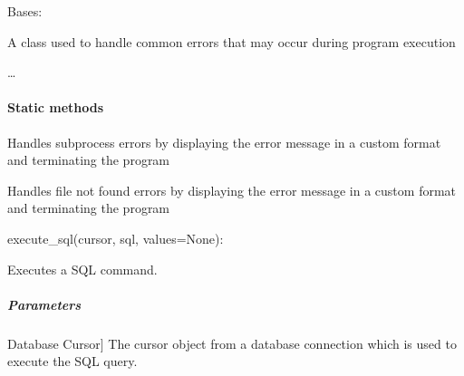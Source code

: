 \documentclass[letterpaper,10pt,english]{sphinxmanual}
\begin{document}
\begin{fulllineitems}
\label{\detokenize{main.error_handler:main.error_handler.error_handler.ErrorHandler}}
\pysigstartsignatures
{}
\pysigstopsignatures
\sphinxAtStartPar
Bases: 

\sphinxAtStartPar
A class used to handle common errors that may occur during program execution

\sphinxAtStartPar
…


\paragraph{Static methods}
\label{\detokenize{main.error_handler:static-methods}}\begin{description}
\sphinxAtStartPar
Handles subprocess errors by displaying the error message in a custom format and terminating the program

\sphinxAtStartPar
Handles file not found errors by displaying the error message in a custom format and terminating the program

\end{description}

\sphinxAtStartPar
execute\_sql(cursor, sql, values=None):

\begin{fulllineitems}
\label{\detokenize{main.error_handler:main.error_handler.error_handler.ErrorHandler.execute_sql}}
\pysigstartsignatures
{}
\pysigstopsignatures
\sphinxAtStartPar
Executes a SQL command.


\subparagraph{Parameters}
\label{\detokenize{main.error_handler:parameters}}\begin{description}
\sphinxlineitem{cursor}{[}Database Cursor{]}
\sphinxAtStartPar
The cursor object from a database connection which is used to execute the SQL query.


\end{description}
\end{fulllineitems}
\end{fulllineitems}
\end{document}
